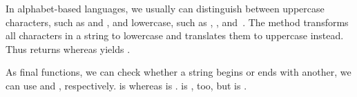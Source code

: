 %
In alphabet-based languages, we usually can distinguish between uppercase characters, such as  and , and lowercase, such as , , and~.
The method  transforms all characters in a string to lowercase and  translates them to uppercase instead.
Thus  returns  whereas  yields .

As final functions, we can check whether a string begins or ends with another, we can use  and , respectively.
 is  whereas  is .
 is , too, but  is .


